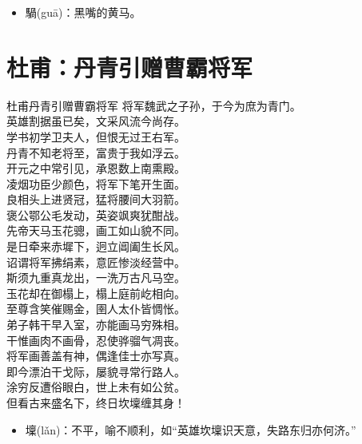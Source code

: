 \documentclass[12pt,oneside,a5paper]{book}
\begin{document}
\begin{itemize}
\item 騧(guā)：黑嘴的黄马。
\end{itemize}

\chapter{杜甫：丹青引赠曹霸将军}
\begin{poemzh}{杜甫}{丹青引赠曹霸将军}
将军魏武之子孙，于今为庶为青门。\\
英雄割据虽已矣，文采风流今尚存。\\
学书初学卫夫人，但恨无过王右军。\\
丹青不知老将至，富贵于我如浮云。\\
开元之中常引见，承恩数上南熏殿。\\
凌烟功臣少颜色，将军下笔开生面。\\
良相头上进贤冠，猛将腰间大羽箭。\\
褒公鄂公毛发动，英姿飒爽犹酣战。\\
先帝天马玉花骢，画工如山貌不同。\\
是日牵来赤墀下，迥立阊阖生长风。\\
诏谓将军拂绢素，意匠惨淡经营中。\\
斯须九重真龙出，一洗万古凡马空。\\
玉花却在御榻上，榻上庭前屹相向。\\
至尊含笑催赐金，圉人太仆皆惆怅。\\
弟子韩干早入室，亦能画马穷殊相。\\
干惟画肉不画骨，忍使骅骝气凋丧。\\
将军画善盖有神，偶逢佳士亦写真。\\
即今漂泊干戈际，屡貌寻常行路人。\\
涂穷反遭俗眼白，世上未有如公贫。\\
但看古来盛名下，终日坎壈缠其身！\\ 
\end{poemzh}

\begin{itemize}
\item 壈(lǎn)：不平，喻不顺利，如“英雄坎壈识天意，失路东归亦何济。”
\end{itemize}
\end{document}

